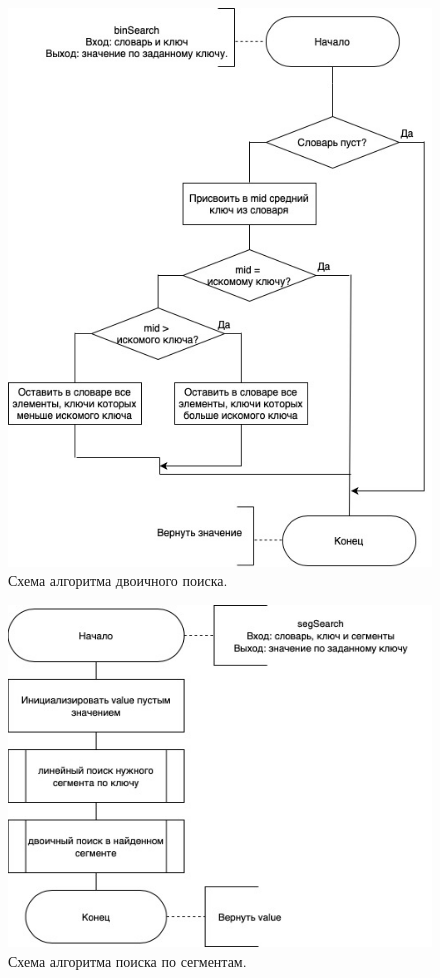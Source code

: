 \begin{figure}[H]
	\centering
	\includegraphics[scale=0.55]{inc/scheme-binSearch.jpg}
	\caption{Схема алгоритма двоичного поиска.}
	\label{fig:bs}
\end{figure}

\begin{figure}[H]
	\centering
	\includegraphics[scale=0.6]{inc/scheme-segSearch.jpg}
	\caption{Схема алгоритма поиска по сегментам.}
	\label{fig:ss}
\end{figure}

